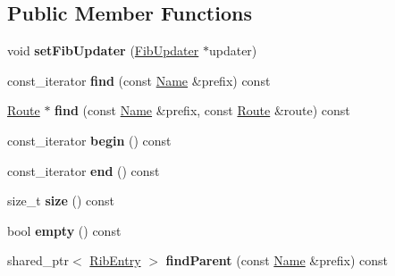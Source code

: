 \subsection*{Public Member Functions}
\begin{DoxyCompactItemize}
\item 
void {\bfseries set\+Fib\+Updater} (\hyperlink{classnfd_1_1rib_1_1FibUpdater}{Fib\+Updater} $\ast$updater)\hypertarget{classnfd_1_1rib_1_1Rib_a67cf91745a5b2c0cdd24874afed1ad6f}{}\label{classnfd_1_1rib_1_1Rib_a67cf91745a5b2c0cdd24874afed1ad6f}

\item 
const\+\_\+iterator {\bfseries find} (const \hyperlink{classndn_1_1Name}{Name} \&prefix) const\hypertarget{classnfd_1_1rib_1_1Rib_aca3547d2f2355a40c1f2a5d297ea56ea}{}\label{classnfd_1_1rib_1_1Rib_aca3547d2f2355a40c1f2a5d297ea56ea}

\item 
\hyperlink{classnfd_1_1rib_1_1Route}{Route} $\ast$ {\bfseries find} (const \hyperlink{classndn_1_1Name}{Name} \&prefix, const \hyperlink{classnfd_1_1rib_1_1Route}{Route} \&route) const\hypertarget{classnfd_1_1rib_1_1Rib_ae8b16b2eae924eb9e4a0c5e8bcb971ca}{}\label{classnfd_1_1rib_1_1Rib_ae8b16b2eae924eb9e4a0c5e8bcb971ca}

\item 
const\+\_\+iterator {\bfseries begin} () const\hypertarget{classnfd_1_1rib_1_1Rib_aab2bfd8d7930d5ea91fffad8b189adc7}{}\label{classnfd_1_1rib_1_1Rib_aab2bfd8d7930d5ea91fffad8b189adc7}

\item 
const\+\_\+iterator {\bfseries end} () const\hypertarget{classnfd_1_1rib_1_1Rib_af99217970188e31c944afdd4a36bc96c}{}\label{classnfd_1_1rib_1_1Rib_af99217970188e31c944afdd4a36bc96c}

\item 
size\+\_\+t {\bfseries size} () const\hypertarget{classnfd_1_1rib_1_1Rib_aee1e4153f1b9110e6fee9ba95c484874}{}\label{classnfd_1_1rib_1_1Rib_aee1e4153f1b9110e6fee9ba95c484874}

\item 
bool {\bfseries empty} () const\hypertarget{classnfd_1_1rib_1_1Rib_ad4b97ee5a9e10ad73580fe0d937eaa58}{}\label{classnfd_1_1rib_1_1Rib_ad4b97ee5a9e10ad73580fe0d937eaa58}

\item 
shared\+\_\+ptr$<$ \hyperlink{classnfd_1_1rib_1_1RibEntry}{Rib\+Entry} $>$ {\bfseries find\+Parent} (const \hyperlink{classndn_1_1Name}{Name} \&prefix) const\hypertarget{classnfd_1_1rib_1_1Rib_afe77d9761f25a63b5a6735d5a029759c}{}\label{classnfd_1_1rib_1_1Rib_afe77d9761f25a63b5a6735d5a029759c}


\end{DoxyCompactItemize}

